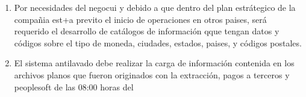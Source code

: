 \begin{enumerate}
\item Por necesidades del negocui y debido a que dentro del plan estrátegico de la compañia est+a previto el inicio de operaciones en otros paises, será requerido el desarrollo de catálogos de información qque tengan datos y códigos sobre el tipo de moneda, ciudades, estados, paises, y códigos postales.
\item El sistema antilavado debe realizar la carga de información contenida en los archivos planos que fueron originados con la extracción, pagos a terceros y peoplesoft  de las 08:00 horas del 
\end{enumerate}

\cleardoublepage

